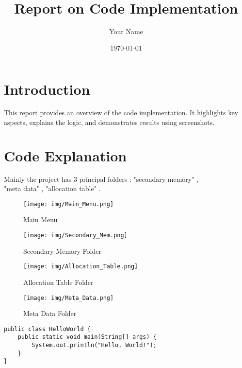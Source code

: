 \documentclass[a4paper,12pt]{article}
\title{Report on Code Implementation}
\author{Your Name}
\date{\today}
\begin{document}
\maketitle
\tableofcontents
\newpage

\section{Introduction}
This report provides an overview of the code implementation. It highlights key aspects, explains the logic, and demonstrates results using screenshots.

\section{Code Explanation}
Mainly the project has 3 principal folders : "secondary memory" ,\\ "meta data" , "allocation table" . 
\begin{figure}
    \centering
    \texttt{[image: img/Main\_Menu.png]}
    \caption{Main Menu}
    \label{fig:enter-label}
\end{figure}


\begin{figure}[h!]
    \centering
    \begin{minipage}[b]{0.3\textwidth}
        \centering
        \texttt{[image: img/Secondary\_Mem.png]}
        \caption*{Secondary Memory Folder}
    \end{minipage}
    \hfill
    \begin{minipage}[b]{0.3\textwidth}
        \centering
        \texttt{[image: img/Allocation\_Table.png]}
        \caption*{Allocation Table Folder}
    \end{minipage}
    \hfill
    \begin{minipage}[b]{0.3\textwidth}
        \centering
        \texttt{[image: img/Meta\_Data.png]}
        \caption*{Meta Data Folder}
    \end{minipage}
    
    \label{fig:three-screenshots}
\end{figure}

\begin{verbatim}
public class HelloWorld {
    public static void main(String[] args) {
        System.out.println("Hello, World!");
    }
}
\end{verbatim}
\end{document}
